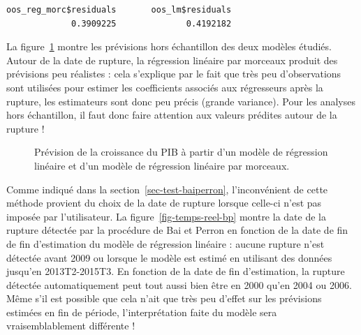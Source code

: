 \documentclass[
  a4paper,
  DIV=11,
  numbers=noendperiod,
  french]{scrartcl}
\newcommand\1{{\mathds 1}}
\theoremstyle{remark}
\begin{document}
\begin{verbatim}
oos_reg_morc$residuals       oos_lm$residuals 
             0.3909225              0.4192182 
\end{verbatim}

La figure~\ref{fig-prev-piecereg} montre les prévisions hors échantillon
des deux modèles étudiés. Autour de la date de rupture, la régression
linéaire par morceaux produit des prévisions peu réalistes : cela
s'explique par le fait que très peu d'observations sont utilisées pour
estimer les coefficients associés aux régresseurs après la rupture, les
estimateurs sont donc peu précis (grande variance). Pour les analyses
hors échantillon, il faut donc faire attention aux valeurs prédites
autour de la rupture !

\begin{figure}

\caption{\label{fig-prev-piecereg}Prévision de la croissance du PIB à
partir d'un modèle de régression linéaire et d'un modèle de régression
linéaire par morceaux.}


\end{figure}%

Comme indiqué dans la section~\ref{sec-test-baiperron}, l'inconvénient
de cette méthode provient du choix de la date de rupture lorsque
celle-ci n'est pas imposée par l'utilisateur. La
figure~\ref{fig-temps-reel-bp} montre la date de la rupture détectée par
la procédure de Bai et Perron en fonction de la date de fin de fin
d'estimation du modèle de régression linéaire : aucune rupture n'est
détectée avant 2009 ou lorsque le modèle est estimé en utilisant des
données jusqu'en 2013T2-2015T3. En fonction de la date de fin
d'estimation, la rupture détectée automatiquement peut tout aussi bien
être en 2000 qu'en 2004 ou 2006. Même s'il est possible que cela n'ait
que très peu d'effet sur les prévisions estimées en fin de période,
l'interprétation faite du modèle sera vraisemblablement différente !
\end{document}
